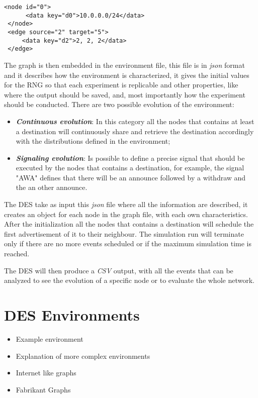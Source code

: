 \begin{lstlisting}[language=graphml, caption=Graph example, label=lst:graph_example]
 <node id="0">
      <data key="d0">10.0.0.0/24</data>
 </node>
 <edge source="2" target="5">                                                  
     <data key="d2">2, 2, 2</data>                                             
 </edge> 
\end{lstlisting}

The graph is then embedded in the environment file, this file is in \textit{json}
format and it describes how the environment is characterized, it gives the
initial values for the \ac{RNG} so that each experiment is replicable and
other properties, like where the output should be saved, and, most importantly
how the experiment should be conducted.
There are two possible evolution of the environment:
\begin{itemize}
    \item \textbf{\textit{Continuous evolution}}: In this category all the nodes
    that contains at least a destination will continuously share and retrieve
    the destination accordingly with the distributions defined in the environment;
    \item \textbf{\textit{Signaling evolution}}: Is possible to define a precise
    signal that should be executed by the nodes that contains a destination, for 
    example, the signal "AWA" defines that there will be an announce followed by 
    a withdraw and the an other announce.
\end{itemize}

The \ac{DES} take as input this \textit{json} file where all the information
are described, it creates an object for each node in the graph file, with
each own characteristics.
After the initialization all the nodes that contains a destination will schedule
the first advertisement of it to their neighbour.
The simulation run will terminate only if there are no more events scheduled or
if the maximum simulation time is reached.

The \ac{DES} will then produce a \textit{CSV} output, with all the events that 
can be analyzed to see the evolution of a specific node or to evaluate the
whole network.
 
\section{DES Environments}
\label{sec:des_environment}

\begin{itemize}
    \item Example environment
    \item Explanation of more complex environments
    \item Internet like graphs
    \item Fabrikant Graphs
\end{itemize}


